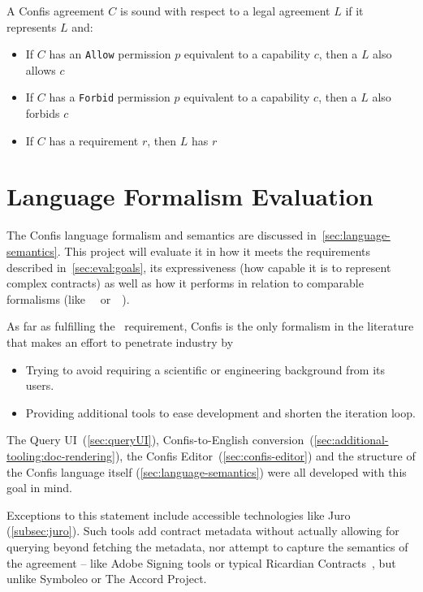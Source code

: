 \begin{definition}[Soundness]
    \label{def:soundness}
    A Confis agreement $C$ is sound with respect to a legal agreement $L$ if it represents $L$ and:

    \begin{itemize}
        \item If $C$ has an \texttt{Allow} permission $p$ equivalent to a capability $c$, then a $L$ also allows $c$
        \item If $C$ has a \texttt{Forbid} permission $p$ equivalent to a capability $c$, then a $L$ also forbids $c$
        \item If $C$ has a requirement $r$, then $L$ has $r$
    \end{itemize}
\end{definition}


\section{Language Formalism Evaluation}\label{sec:language-formalism-evaluation}

The Confis language formalism and semantics are discussed in~\autoref{sec:language-semantics}.
This project will evaluate it in how it meets the requirements described in~\autoref{sec:eval:goals}, its expressiveness (how capable it is to represent complex contracts) as well as how it performs in relation to comparable formalisms (like~~\cite{symboleo2020} or~~\cite{accordHomepage}).

As far as fulfilling the~ requirement, Confis is the only formalism in the literature that makes an effort to penetrate industry by
\begin{itemize}
    \item Trying to avoid requiring a scientific or engineering background from its users.
    \item Providing additional tools to ease development and shorten the iteration loop.
\end{itemize}

The Query UI~(\autoref{sec:queryUI}), Confis-to-English conversion~(\autoref{sec:additional-tooling:doc-rendering}), the Confis Editor~(\autoref{sec:confis-editor}) and the structure of the Confis language itself (\autoref{sec:language-semantics}) were all developed with this goal in mind.

Exceptions to this statement include accessible technologies like Juro (\autoref{subsec:juro}).
Such tools add contract metadata without actually allowing for querying beyond fetching the metadata, nor attempt to capture the semantics of the agreement -- like Adobe Signing tools or typical Ricardian Contracts~\cite{ricardianWeb}, but unlike Symboleo or The Accord Project.\\

